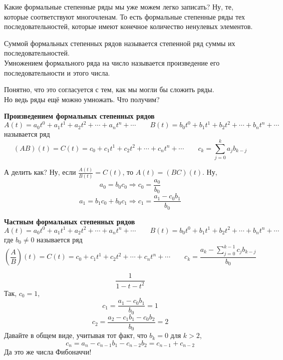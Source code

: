 \documentclass{article}
\begin{document}
    \begin{example}
        Какие формальные степенные ряды мы уже можем легко записать? Ну, те, которые соответствуют многочленам. То есть формальные степенные ряды тех последовательностей, которые имеют конечное количество ненулевых элементов.
    \end{example}
    \begin{definition}
        Суммой формальных степенных рядов называется степенной ряд суммы их последовательностей.\\
        Умножением формального ряда на число называется произведение его последовательности и этого числа.
    \end{definition}
    \begin{remark}
        Понятно, что это согласуется с тем, как мы могли бы сложить ряды.\\
        Но ведь ряды ещё можно умножать. Что получим?
    \end{remark}
    \begin{definition}
        \textbf{Произведением формальных степенных рядов}
        $$
        A(t)=a_0t^0+a_1t^1+a_2t^2+\cdots+a_nt^n+\cdots\qquad B(t)=b_0t^0+b_1t^1+b_2t^2+\cdots+b_nt^n+\cdots
        $$
        называется ряд
        $$
        (AB)(t)=C(t)=c_0+c_1t^1+c_2t^2+\cdots+c_nt^n+\cdots\qquad c_k=\sum\limits_{j=0}^ka_jb_{k-j}
        $$
    \end{definition}
    \begin{remark}
        А делить как? Ну, если $\frac{A(t)}{B(t)}=C(t)$, то $A(t)=(BC)(t)$. Ну,
        $$
        a_0=b_0c_0\Rightarrow c_0=\frac{a_0}{b_0}
        $$
        $$
        a_1=b_1c_0+b_0c_1\Rightarrow c_1=\frac{a_1-c_0b_1}{b_0}
        $$
    \end{remark}
    \begin{definition}
        \textbf{Частным формальных степенных рядов}
        $$
        A(t)=a_0t^0+a_1t^1+a_2t^2+\cdots+a_nt^n+\cdots\qquad B(t)=b_0t^0+b_1t^1+b_2t^2+\cdots+b_nt^n+\cdots
        $$
        где $b_0\neq0$ называется ряд
        $$
        (\frac AB)(t)=C(t)=c_0+c_1t^1+c_2t^2+\cdots+c_nt^n+\cdots\qquad c_k=\frac{a_k-\sum\limits_{j=0}^{k-1}c_jb_{k-j}}{b_0}
        $$
    \end{definition}
    \begin{example}
        $$
        \frac1{1-t-t^2}
        $$
        Так, $c_0=1$,
        $$
        c_1=\frac{a_1-c_0b_1}{b_0}=1
        $$
        $$
        c_2=\frac{a_2-c_1b_1-c_0b_2}{b_0}=2
        $$
        Давайте в общем виде, учитывая тот факт, что $b_k=0$ для $k>2$,
        $$
        c_n=a_n-c_{n-1}b_1-c_{n-2}b_2=c_{n-1}+c_{n-2}
        $$
        Да это же числа Фибоначчи!
    \end{example}
\end{document}
